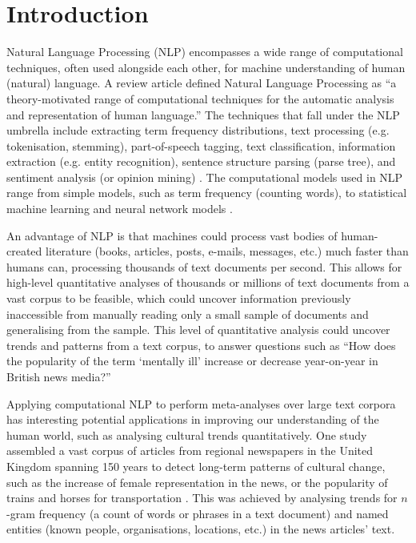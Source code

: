 \documentclass{report}
\begin{document}
\chapter{Introduction} \label{Introduction} %


Natural Language Processing (NLP) encompasses a wide range of computational techniques, often used alongside each other, for machine understanding of human (natural) language.
A review article \cite{cambria2014jumping} defined Natural Language Processing as ``a theory-motivated range of computational techniques for the automatic analysis and representation of human language.''
The techniques that fall under the NLP umbrella include extracting term frequency distributions, text processing (e.g. tokenisation, stemming), part-of-speech tagging, text classification, information extraction (e.g. entity recognition), sentence structure parsing (parse tree), and sentiment analysis (or opinion mining) \cite{Nltk, liu2012sentiment}.
The computational models used in NLP range from simple models, such as term frequency (counting words), to statistical machine learning and neural network models \cite{awesome-sentiment-analysis}. 

An advantage of NLP is that machines could process vast bodies of human-created literature (books, articles, posts, e-mails, messages, etc.) much faster than humans can, processing thousands of text documents per second. 
This allows for high-level quantitative analyses of thousands or millions of text documents from a vast corpus to be feasible, which could uncover information previously inaccessible from manually reading only a small sample of documents and generalising from the sample.
This level of quantitative analysis could uncover trends and patterns from a text corpus, to answer questions such as ``How does the popularity of the term `mentally ill' increase or decrease year-on-year in British news media?'' 

Applying computational NLP to perform meta-analyses over large text corpora has interesting potential applications in improving our understanding of the human world, such as analysing cultural trends quantitatively.
One study assembled a vast corpus of articles from regional newspapers in the United Kingdom spanning 150 years to detect long-term patterns of cultural change, such as the increase of female representation in the news, or the popularity of trains and horses for transportation \cite{lansdall2017content}. 
This was achieved by analysing trends for $n$-gram frequency (a count of words or phrases in a text document) and named entities (known people, organisations, locations, etc.) in the news articles' text.
\end{document}
